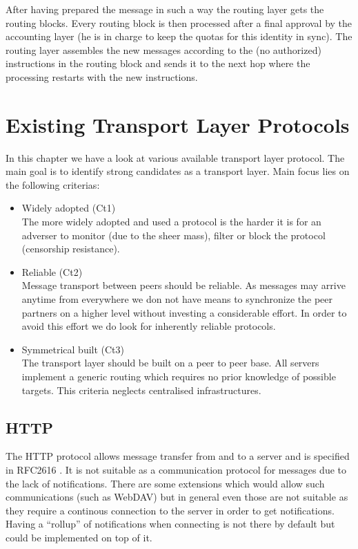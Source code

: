 After having prepared the message in such a way the routing layer gets the routing blocks. Every routing block is then processed after a final approval by the accounting layer (he is in charge to keep the quotas for this identity in  sync). The routing layer assembles the new messages according to the (no authorized) instructions in the routing block and sends it to the next hop where the processing restarts with the new instructions. 

\chapter{Existing Transport Layer Protocols}
In this chapter we have a look at various available transport layer protocol. The main goal is to identify strong candidates as a transport layer. Main focus lies on the following criterias:
\begin{itemize}
	\item Widely adopted (Ct1)\\
	The more widely adopted and used a protocol is the harder it is for an adverser to monitor (due to the sheer mass), filter or block the protocol (censorship resistance).
	\item Reliable (Ct2)\\
	Message transport between peers should be reliable. As messages may arrive anytime from everywhere we don not have means to synchronize the peer partners on a higher level without investing a considerable effort. In order to avoid this effort we do look for inherently reliable protocols.
	\item Symmetrical built (Ct3)\\
	The transport layer should be built on a peer to peer base. All servers implement a generic routing which requires no prior knowledge of possible targets. This criteria neglects centralised infrastructures.
\end{itemize}

\section{HTTP}
The HTTP protocol allows message transfer from and to a server and is specified in RFC2616 \cite{RFC2616}. It is not suitable as a communication protocol for messages due to the lack of notifications. There are some extensions which would allow such communications (such as WebDAV) but in general even those are not suitable as they require a continous connection to the server in order to get notifications. Having a ``rollup'' of notifications when connecting is not there by default but could be implemented on top of it. 

